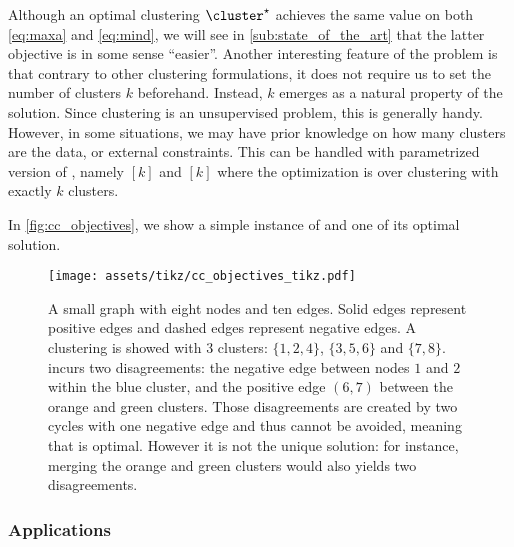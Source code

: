 Although an optimal clustering $\cluster^\star$ achieves the same value on both \eqref{eq:maxa}
and \eqref{eq:mind}, we will see in \autoref{sub:state_of_the_art} that the latter objective is in
some sense \enquote{easier}. Another interesting feature of the \pcc{} problem is that contrary to
other clustering formulations, it does not require us to set the number of clusters $k$ beforehand.
Instead, $k$ emerges as a natural property of the solution. Since clustering is an unsupervised
problem, this is generally handy. However, in some situations, we may have prior knowledge on how
many clusters are the data, or external constraints. This can be handled with parametrized version
of \pcc{}, namely \maxa$[k]$ and \mind$[k]$ where the optimization is over clustering with exactly
$k$ clusters.

In \autoref{fig:cc_objectives}, we show a simple instance of \pcc{} and one of its optimal solution.
\begin{figure}[hbt]
	\centering
	\texttt{[image: assets/tikz/cc\_objectives\_tikz.pdf]}
	\caption[Small example of \pcc{}]{A small graph with eight nodes and ten edges. Solid edges
	represent positive edges and dashed edges represent negative edges. A clustering \cluster{}
	is showed with 3 clusters: $\{1, 2, 4\}$, $\{3, 5, 6\}$ and $\{7, 8\}$. \cluster{} incurs two
	disagreements: the negative edge between nodes $1$ and $2$ within the blue cluster, and the
	positive edge $(6,7)$ between the orange and green clusters. Those disagreements are created
	by two cycles with one negative edge and thus cannot be avoided, meaning that \cluster{} is
	optimal. However it is not the unique solution: for instance, merging the orange and green
	clusters would also yields two disagreements.}
	\label{fig:cc_objectives}
\end{figure}

\subsubsection{Applications}
\label{ssub:cc_applications}

